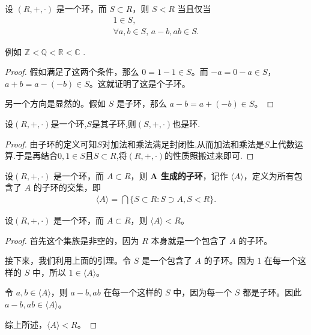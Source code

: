 \documentclass[../../main.tex]{subfiles}
\begin{document}
\begin{lemma}[子环的充要条件]\label{lemma:子环的充要条件}
设 $(R, +, \cdot)$ 是一个环，而 $S \subset R$，则 $S < R$ 当且仅当
\begin{gather*}
1 \in S ,\\
\forall a, b \in S, \, a - b, ab \in S .
\end{gather*}
\end{lemma}
\begin{note}
例如 $\mathbb{Z}< \mathbb{Q}< \mathbb{R}< \mathbb{C}$ . 
\end{note}
\begin{proof}
假如满足了这两个条件，那么 $0 = 1 - 1 \in S$。而 $-a = 0 - a \in S$，$a + b = a - (-b) \in S$。这就证明了这是个子环。

另一个方向是显然的。假如 $S$ 是子环，那么 $a - b = a + (-b) \in S$。
\end{proof}

\begin{proposition}[子环仍是环]\label{proposition:子环仍是环}
设$(R,+,\cdot)$是一个环,$S$是其子环,则$(S,+,\cdot)$也是环.
\end{proposition}
\begin{proof}
由子环的定义可知$S$对加法和乘法满足封闭性,从而加法和乘法是$S$上代数运算.于是再结合$0,1\in S$且$S\subset R$,将$(R,+,\cdot)$的性质照搬过来即可.
\end{proof}

\begin{definition}[由子集生成的子环]
设$(R, +, \cdot)$ 是一个环，而 $A \subset R$，则 \textbf{$\boldsymbol{A}$ 生成的子环}，记作 $\langle A\rangle$，定义为所有包含了 $A$ 的子环的交集，即
\begin{align*}
\langle A\rangle = \bigcap \{S \subset R : S \supset A, S < R\} .
\end{align*}
\end{definition}

\begin{proposition}[由子集生成的子环仍是子环]\label{proposition:生成的子环仍是子环}
设$(R, +, \cdot)$ 是一个环，而 $A \subset R$，则 $\langle A\rangle < R$。
\end{proposition}
\begin{proof}
首先这个集族是非空的，因为 $R$ 本身就是一个包含了 $A$ 的子环。

接下来，我们利用上面的引理。令 $S$ 是一个包含了 $A$ 的子环。因为 $1$ 在每一个这样的 $S$ 中，所以 $1 \in \langle A\rangle$。

令 $a, b \in \langle A\rangle$，则 $a - b, ab$ 在每一个这样的 $S$ 中，因为每一个 $S$ 都是子环。因此 $a - b, ab \in \langle A\rangle$。

综上所述，$\langle A\rangle < R$。
\end{proof}
\end{document}
